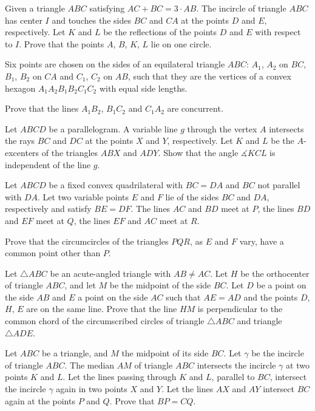 \item[\textbf{G1.}]
Given a triangle 
$ABC$
 satisfying 
$AC+BC=3\cdot AB$.
 The incircle of triangle 
$ABC$
 has center 
$I$
 and touches the sides 
$BC$
 and 
$CA$
 at the points 
$D$
 and 
$E$, 
 respectively. Let 
$K$
 and 
$L$
 be the reflections of the points 
$D$
 and 
$E$
 with respect to 
$I$.
 Prove that the points 
$A$, 
$B$, 
$K$, 
$L$
 lie on one circle.

\item[\textbf{G2.}]
Six points are  chosen on the sides of an equilateral triangle 
$ABC$:
$A_1$,
$A_2$ on 
$BC$,
$B_1$, 
$B_2$
 on 
$CA$
 and 
$C_1$, 
$C_2$
 on 
$AB$, 
 such that they are the vertices of a convex hexagon 
$A_1A_2B_1B_2C_1C_2$
 with equal side lengths.


Prove that the lines 
$A_1B_2$, 
$B_1C_2$
 and 
$C_1A_2$
 are concurrent.

\item[\textbf{G3.}]
Let 
$ABCD$
 be a parallelogram. A variable line 
$g$
 through the vertex 
$A$
 intersects the rays 
$BC$
 and 
$DC$
 at the points 
$X$
 and 
$Y$, 
 respectively. Let 
$K$
 and 
$L$
 be the 
$A$-excenters of the triangles 
$ABX$
 and 
$ADY$.
 Show that the angle 
$\measuredangle KCL$
 is independent of the line 
$g$.

\item[\textbf{G4.}]
Let 
$ABCD$
 be a fixed convex quadrilateral with 
$BC=DA$
 and 
$BC$
 not parallel with 
$DA$.
 Let two variable points 
$E$
 and 
$F$
 lie of the sides 
$BC$
 and 
$DA$, 
 respectively and satisfy 
$BE=DF$.
 The lines 
$AC$
 and 
$BD$
 meet at 
$P$, 
 the lines 
$BD$
 and 
$EF$
 meet at 
$Q$, 
 the lines 
$EF$
 and 
$AC$
 meet at 
$R$.


Prove that the circumcircles of the triangles 
$PQR$, 
 as 
$E$
 and 
$F$
 vary, have a common point other than 
$P$.

\item[\textbf{G5.}]
Let 
$\triangle ABC$
 be an acute-angled triangle with 
$AB \not= AC$.
 Let 
$H$
 be the orthocenter of triangle 
$ABC$, 
 and let 
$M$
 be the midpoint of the side 
$BC$.
 Let 
$D$
 be a point on the side 
$AB$
 and 
$E$
 a point on the side 
$AC$
 such that 
$AE=AD$
 and the points 
$D$, 
$H$, 
$E$
 are on the same line. Prove that the line 
$HM$
 is perpendicular to the common chord of the circumscribed circles of triangle 
$\triangle ABC$
 and triangle 
$\triangle ADE$.

\item[\textbf{G6.}]
Let 
$ABC$
 be a triangle, and 
$M$
 the midpoint of its side 
$BC$.
 Let 
$\gamma$
 be the incircle of triangle 
$ABC$.
 The median 
$AM$
 of triangle 
$ABC$
 intersects the incircle 
$\gamma$
 at two points 
$K$
 and 
$L$.
 Let the lines passing through 
$K$
 and 
$L$, 
 parallel to 
$BC$, 
 intersect the incircle 
$\gamma$
 again in two points 
$X$
 and 
$Y$.
 Let the lines 
$AX$
 and 
$AY$
 intersect 
$BC$
 again at the points 
$P$
 and 
$Q$.
 Prove that 
$BP = CQ$.


